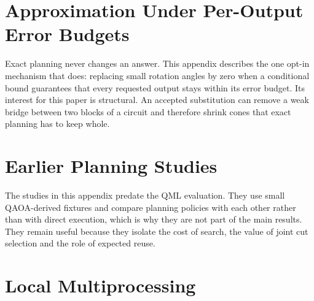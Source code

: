 \clearpage
\appendices
\section{Approximation Under Per-Output Error Budgets}
\label{app:sensitivity}
Exact planning never changes an answer. This appendix describes the one opt-in mechanism that does: replacing small rotation angles by zero when a conditional bound guarantees that every requested output stays within its error budget. Its interest for this paper is structural. An accepted substitution can remove a weak bridge between two blocks of a circuit and therefore shrink cones that exact planning has to keep whole.







\section{Earlier Planning Studies}
\label{app:earlier}
The studies in this appendix predate the QML evaluation. They use small QAOA-derived fixtures and compare planning policies with each other rather than with direct execution, which is why they are not part of the main results. They remain useful because they isolate the cost of search, the value of joint cut selection and the role of expected reuse.



\section{Local Multiprocessing}
\label{app:parallel}




